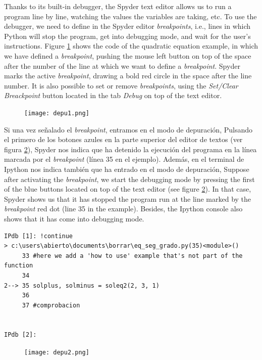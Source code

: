 \begin{paracol}{2}
Thanks to its built-in debugger, the Spyder text editor allows us to run a program line by line, watching the values the variables are taking, etc. To use the debugger, we need to define in the Spyder editor \emph{breakpoints}, i.e., lines in which Python will stop the program, get into debugging mode, and wait for the user's instructions. Figure \ref{fig:depu1} shows the code of the quadratic equation example, in which we have defined a \emph{breakpoint}, pushing the mouse left button on top of the space after the number of the line at which we want to define a \emph{breakpoint}. Spyder marks the active \emph{breakpoint}, drawing a bold red circle in the space after the line number. It is also possible to set or remove \emph{breakpoints}, using the \emph{Set/Clear Breackpoint} button located in the tab \emph{Debug} on top of the text editor.
\end{paracol}

\begin{figure}
\centering
\texttt{[image: depu1.png]}
\label{fig:depu1}
\end{figure}

\begin{paracol}{2}
Si una vez señalado el \emph{breakpoint},  entramos en el modo de depuración, Pulsando el primero de los botones azules en la parte superior del editor de textos (ver figura \ref{fig:depu2}),
Spyder nos indica que ha detenido la ejecución del programa en la línea marcada por el \emph{breakpoint} (línea 35 en el ejemplo). Además, en el terminal de Ipython nos indica también que ha entrado en el modo de depuración,
\switchcolumn
Suppose after activating the \emph{breakpoint}, we start the debugging mode by pressing the first of the blue buttons located on top of the text editor (see figure \ref{fig:depu2}). In that case, Spyder shows us that it has stopped the program run at the line marked by the \emph{breakpoint} red dot (line 35 in the example). Besides, the Ipython console also shows that it has come into debugging mode.
\end{paracol}
\begin{verbatim}
IPdb [1]: !continue
> c:\users\abierto\documents\borrar\eq_seg_grado.py(35)<module>()
     33 #here we add a 'how to use' example that's not part of the function
     34 
2--> 35 solplus, solminus = soleq2(2, 3, 1)
     36 
     37 #comprobacion


IPdb [2]: 
\end{verbatim}
\begin{figure}
\centering
\texttt{[image: depu2.png]}
\label{fig:depu2}
\end{figure}

